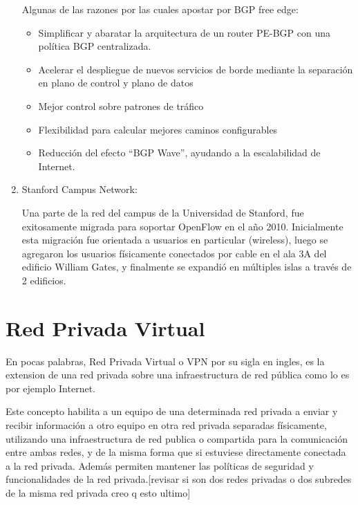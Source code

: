 \begin{enumerate}
Algunas de las razones por las cuales apostar por BGP free edge:
\begin{itemize}
\item Simplificar y abaratar la arquitectura de un router PE-BGP con una política BGP centralizada.
\item Acelerar el despliegue de nuevos servicios de borde mediante la separación en plano de control y plano de datos
\item Mejor control sobre patrones de tráfico
\item Flexibilidad para calcular mejores caminos configurables
\item Reducción del efecto ``BGP Wave'', ayudando a la escalabilidad de Internet.
\end{itemize}

\item Stanford Campus Network:

Una parte de la red del campus de la Universidad de Stanford, fue exitosamente migrada para soportar OpenFlow en el año 2010.
Inicialmente esta migración fue orientada a usuarios en particular (wireless), luego se agregaron los usuarios físicamente conectados por cable en el ala 3A del edificio William Gates, y finalmente se expandió en múltiples islas a través de 2 edificios.

\end{enumerate}

\section{Red Privada Virtual}
\label{section2.7}

En pocas palabras, Red Privada Virtual o VPN por su sigla en ingles, es la extension de una red privada sobre una infraestructura de red p\'ublica como lo es por ejemplo Internet.

Este concepto habilita a un equipo de una determinada red privada a enviar y recibir información a otro equipo en otra red privada separadas f\'isicamente, utilizando una infraestructura de red publica o compartida para la comunicaci\'on entre ambas redes, y de la misma forma que si estuviese directamente conectada a la red privada. Adem\'as permiten mantener las políticas de seguridad y funcionalidades de la red privada.[revisar si son dos redes privadas o dos subredes de la misma red privada creo q esto ultimo]\\


